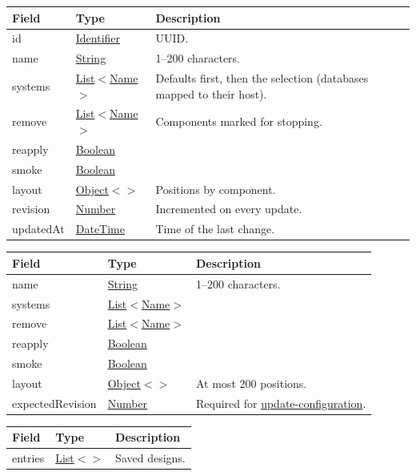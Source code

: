 \documentclass[a4paper]{arrowhead}
\newcommand{\mref}[2][]{{\textcolor{ArrowheadPurple}{\hyperref[sec:model:#2]{\ifstrempty{#1}{#2}{#1}}}}}
\newcommand{\oref}[1]{{\textcolor{ArrowheadBlue}{\hyperref[sec:operations:#1]{#1}}}}
\newcommand{\pref}[1]{{\textcolor{ArrowheadGrey}{\hyperref[sec:model:primitives:#1]{#1}}}}
\begin{document}

\noindent\begin{tabularx}{\textwidth}{| >{\raggedright\arraybackslash}p{3.6cm} | >{\raggedright\arraybackslash\small}p{4.4cm} | X |} \hline
\rowcolor{gray!33} Field & Type & Description \\ \hline
id & \pref{Identifier} & UUID. \\ \hline
name & \pref{String} & 1--200 characters. \\ \hline
systems & \pref{List}$<$\pref{Name}$>$ & Defaults first, then the selection (databases mapped to their host). \\ \hline
remove & \pref{List}$<$\pref{Name}$>$ & Components marked for stopping. \\ \hline
reapply & \pref{Boolean} &  \\ \hline
smoke & \pref{Boolean} &  \\ \hline
layout & \pref{Object}$<$\mref{Point}$>$ & Positions by component. \\ \hline
revision & \pref{Number} & Incremented on every update. \\ \hline
updatedAt & \pref{DateTime} & Time of the last change. \\ \hline
\end{tabularx}


\noindent\begin{tabularx}{\textwidth}{| >{\raggedright\arraybackslash}p{3.6cm} | >{\raggedright\arraybackslash\small}p{4.4cm} | X |} \hline
\rowcolor{gray!33} Field & Type & Description \\ \hline
name & \pref{String} & 1--200 characters. \\ \hline
systems & \pref{List}$<$\pref{Name}$>$ &  \\ \hline
remove & \pref{List}$<$\pref{Name}$>$ &  \\ \hline
reapply & \pref{Boolean} &  \\ \hline
smoke & \pref{Boolean} &  \\ \hline
layout & \pref{Object}$<$\mref{Point}$>$ & At most 200 positions. \\ \hline
expectedRevision & \pref{Number} & Required for \oref{update-configuration}. \\ \hline
\end{tabularx}


\noindent\begin{tabularx}{\textwidth}{| >{\raggedright\arraybackslash}p{3.6cm} | >{\raggedright\arraybackslash\small}p{4.4cm} | X |} \hline
\rowcolor{gray!33} Field & Type & Description \\ \hline
entries & \pref{List}$<$\mref{Configuration}$>$ & Saved designs. \\ \hline
\end{tabularx}
\end{document}

